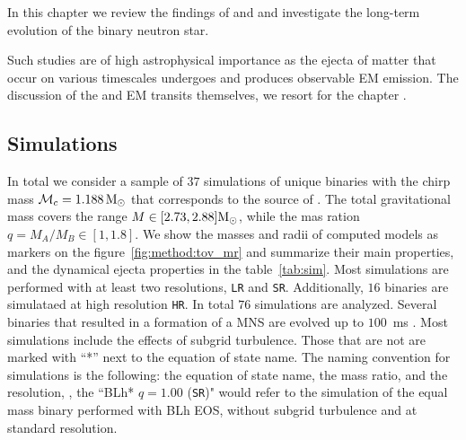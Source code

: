 In this chapter we review the findings of \citet{Nedora:2019jhl} and \citet{Nedora:2020pak}
and investigate the long-term \pmerg{} evolution of the binary neutron star. 

Such studies are of high astrophysical importance as the ejecta of matter that occur 
on various timescales \pmerg{} undergoes \rproc{} and produces observable EM emission. 
The discussion of the \rproc{} and EM transits themselves, we resort for the chapter .


\subsection{Simulations}







In total we consider a sample of $37$ simulations of unique binaries with the 
chirp mass $\mathcal{M}_c = 1.188\,{\text{M}_{\odot}}$ that corresponds to the source of \GW{}.
The total gravitational mass covers the range $M\in[2.73, 2.88]{\text{M}_{\odot}}$, while the 
mas ration $q=M_A/M_B\in[1,1.8]$. 
We show the masses and radii of computed models as markers on the 
figure~\ref{fig:method:tov_mr} and summarize their main properties, 
and the dynamical ejecta properties in the table~\ref{tab:sim}.
Most simulations are performed with at least two resolutions, 
\texttt{LR} and \texttt{SR}. 
Additionally, $16$ binaries are simulataed at high resolution \texttt{HR}.
In total $76$ simulations are analyzed.
Several binaries that resulted in a formation of a MNS are evolved up to 
$100$~ms \pmerg.
Most simulations include the effects of subgrid turbulence. 
Those that are not are marked with ``*'' next to the equation of state name.
The naming convention for simulations is the following: 
the equation of state name, the mass ratio, and the resolution, \eg, 
the ``BLh* $q=1.00$ (\texttt{SR})" would refer to the simulation of the equal mass
binary performed with BLh EOS, without subgrid turbulence and at standard resolution. 



